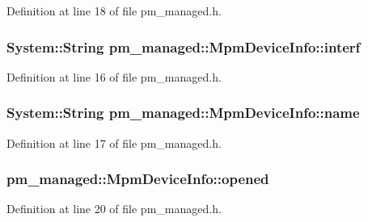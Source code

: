 Definition at line 18 of file pm\+\_\+managed.\+h.

\subsubsection[{\texorpdfstring{interf}{interf}}]{\setlength{\rightskip}{0pt plus 5cm}System\+::\+String pm\+\_\+managed\+::\+Mpm\+Device\+Info\+::interf}\hypertarget{classpm__managed_1_1_mpm_device_info_a033899e3bff73e917b8c15814851f47c}{}\label{classpm__managed_1_1_mpm_device_info_a033899e3bff73e917b8c15814851f47c}


Definition at line 16 of file pm\+\_\+managed.\+h.

\subsubsection[{\texorpdfstring{name}{name}}]{\setlength{\rightskip}{0pt plus 5cm}System\+::\+String pm\+\_\+managed\+::\+Mpm\+Device\+Info\+::name}\hypertarget{classpm__managed_1_1_mpm_device_info_ace3c04e502bc1458af907bc98b06ecc7}{}\label{classpm__managed_1_1_mpm_device_info_ace3c04e502bc1458af907bc98b06ecc7}


Definition at line 17 of file pm\+\_\+managed.\+h.

\subsubsection[{\texorpdfstring{opened}{opened}}]{ pm\+\_\+managed\+::\+Mpm\+Device\+Info\+::opened}\hypertarget{classpm__managed_1_1_mpm_device_info_a8d15bf067a4d77edf7e42e2b1b4b0ab6}{}\label{classpm__managed_1_1_mpm_device_info_a8d15bf067a4d77edf7e42e2b1b4b0ab6}


Definition at line 20 of file pm\+\_\+managed.\+h.

